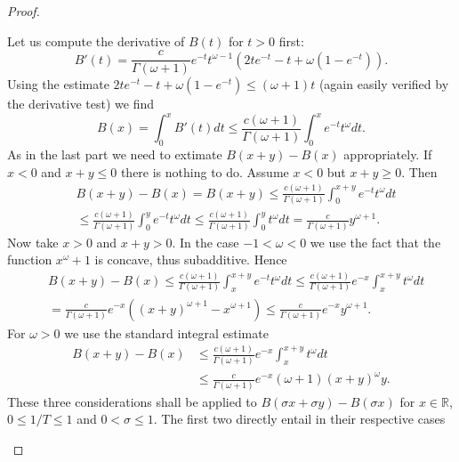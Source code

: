 \begin{proof}
\begin{enumerate}
    Let us compute the derivative of $B(t)$ for $t > 0$ first:
    \begin{equation*}
        B'(t) = \frac{c}{\Gamma(\omega + 1)} e^{-t} t^{\omega-1} (2t e^{-t} - t + \omega(1-e^{-t})).
    \end{equation*}
    Using the estimate $2t e^{-t} - t + \omega(1-e^{-t}) \leq (\omega + 1)t$ (again easily verified by the derivative test) we find
    \begin{equation*}
        B(x) = \int_0^x B'(t) dt 
        \leq \frac{c(\omega + 1)}{\Gamma(\omega + 1)} \int_0^x e^{-t} t^\omega dt.
    \end{equation*}
    As in the last part we need to extimate $B(x+y) - B(x)$ appropriately.
    If $x < 0$ and $x+y \leq 0$ there is nothing to do.
    Assume $x < 0$ but $x+y \geq 0$. Then
    \begin{align*}
        &B(x+y) - B(x) = B(x+y) 
        \leq \frac{c(\omega + 1)}{\Gamma(\omega + 1)} \int_0^{x+y} e^{-t} t^\omega dt \\
        &\leq \frac{c(\omega + 1)}{\Gamma(\omega + 1)} \int_0^{y} e^{-t} t^\omega dt
        \leq \frac{c(\omega + 1)}{\Gamma(\omega + 1)} \int_0^{y} t^\omega dt
        = \frac{c}{\Gamma(\omega + 1)} y^{\omega + 1}.
    \end{align*}
    Now take $x>0$ and $x+y>0$. In the case $-1 < \omega < 0$ we use the fact that the function $x^{\omega}+1$ is concave, thus subadditive. Hence
    \begin{align*}
        &B(x+y) - B(x)
        \leq \frac{c(\omega + 1)}{\Gamma(\omega + 1)} \int_x^{x+y} e^{-t} t^\omega dt
        \leq \frac{c(\omega + 1)}{\Gamma(\omega + 1)} e^{-x} \int_x^{x+y} t^\omega dt \\
        &= \frac{c}{\Gamma(\omega + 1)} e^{-x} ((x+y)^{\omega + 1} - x^{\omega + 1})
        \leq \frac{c}{\Gamma(\omega + 1)} e^{-x} y^{\omega + 1}.
    \end{align*}
    For $\omega > 0$ we use the standard integral estimate
    \begin{align*}
        B(x+y) - B(x)
        &\leq \frac{c(\omega + 1)}{\Gamma(\omega + 1)} e^{-x} \int_x^{x+y} t^\omega dt \\
        &\leq \frac{c}{\Gamma(\omega + 1)} e^{-x} (\omega + 1) (x+y)^{\omega}y.
    \end{align*}
    These three considerations shall be applied to $B(\sigma x + \sigma y) - B(\sigma x)$ for $x \in \mathbb{R}$, $0 \leq 1/T \leq 1$ and $0 < \sigma \leq 1$.
    The first two directly entail in their respective cases

\end{enumerate}
\end{proof}
